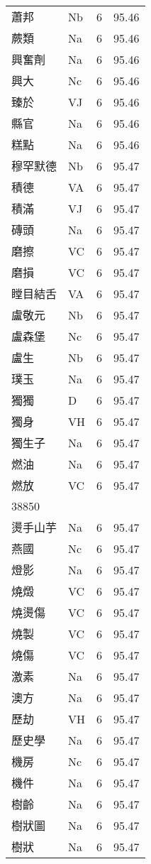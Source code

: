 \documentclass[twocolumn]{book}
\begin{document}
\begin{supertabular}{llrr}
蕭邦 & Nb & 6 &  95.46\\
蕨類 & Na & 6 &  95.46\\
興奮劑 & Na & 6 &  95.46\\
興大 & Nc & 6 &  95.46\\
臻於 & VJ & 6 &  95.46\\
縣官 & Na & 6 &  95.46\\
糕點 & Na & 6 &  95.46\\
穆罕默德 & Nb & 6 &  95.47\\
積德 & VA & 6 &  95.47\\
積滿 & VJ & 6 &  95.47\\
磚頭 & Na & 6 &  95.47\\
磨擦 & VC & 6 &  95.47\\
磨損 & VC & 6 &  95.47\\
瞠目結舌 & VA & 6 &  95.47\\
盧敬元 & Nb & 6 &  95.47\\
盧森堡 & Nc & 6 &  95.47\\
盧生 & Nb & 6 &  95.47\\
璞玉 & Na & 6 &  95.47\\
獨獨 & D & 6 &  95.47\\
獨身 & VH & 6 &  95.47\\
獨生子 & Na & 6 &  95.47\\
燃油 & Na & 6 &  95.47\\
燃放 & VC & 6 &  95.47\\
38850\\
燙手山芋 & Na & 6 &  95.47\\
燕國 & Nc & 6 &  95.47\\
燈影 & Na & 6 &  95.47\\
燒燬 & VC & 6 &  95.47\\
燒燙傷 & VC & 6 &  95.47\\
燒製 & VC & 6 &  95.47\\
燒傷 & VC & 6 &  95.47\\
激素 & Na & 6 &  95.47\\
澳方 & Na & 6 &  95.47\\
歷劫 & VH & 6 &  95.47\\
歷史學 & Na & 6 &  95.47\\
機房 & Nc & 6 &  95.47\\
機件 & Na & 6 &  95.47\\
樹齡 & Na & 6 &  95.47\\
樹狀圖 & Na & 6 &  95.47\\
樹狀 & Na & 6 &  95.47\\

\end{supertabular}
\end{document}
